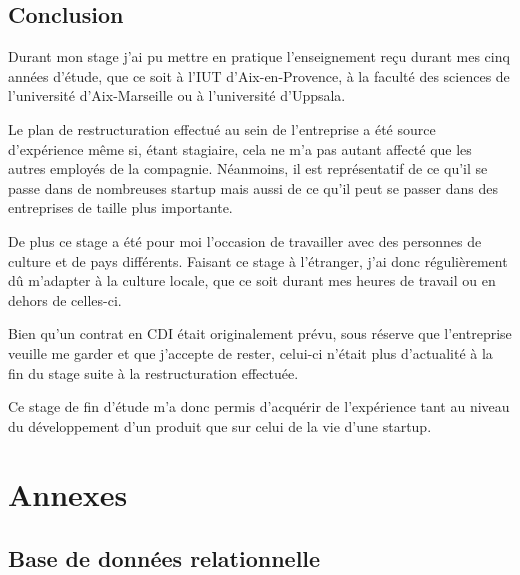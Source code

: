\documentclass[a4paper,10pt, twoside]{report}
\begin{document}
\begin{spacing}{1.2}
\chapter{Conclusion}

Durant mon stage j'ai pu mettre en pratique l'enseignement reçu durant mes cinq
années d'étude, que ce soit à l'IUT d'Aix-en-Provence, à la faculté des sciences
de l'université d'Aix-Marseille ou à l'université d'Uppsala.

Le plan de restructuration effectué au sein de l'entreprise a été
source d'expérience même si, étant stagiaire, cela ne m'a pas autant
affecté que les autres employés de la compagnie. Néanmoins, il est
représentatif de ce qu'il se passe dans de nombreuses startup mais aussi de
ce qu'il peut se passer dans des entreprises de taille plus importante.

De plus ce stage a été pour moi l'occasion de travailler avec des personnes
de culture et de pays différents. Faisant ce stage à l'étranger, j'ai donc
régulièrement dû m'adapter à la culture locale, que ce soit durant mes
heures de travail ou en dehors de celles-ci.

Bien qu'un contrat en CDI était originalement prévu, sous réserve que
l'entreprise veuille me garder et que j'accepte de rester, celui-ci n'était
plus d'actualité à la fin du stage suite à la restructuration effectuée.

Ce stage de fin d'étude m'a donc permis d'acquérir de l'expérience tant au
niveau du développement d'un produit que sur celui de la vie d'une startup.

\newpage
\listoffigures
\listoftables



\appendix
\makeatletter
\def\@seccntformat#1{Annexe~\csname the#1\endcsname:\quad}
\makeatother
\part{Annexes}
\chapter{Base de données relationnelle}
\thispagestyle{fancy}
\label{annBDR}
\thispagestyle{fancy}

\end{spacing}
\end{document}
